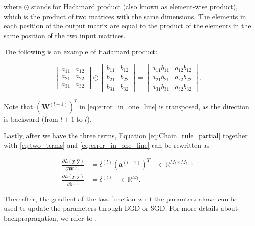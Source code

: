 \documentclass[
	parskip, 			   %
	twoside, 			   %
	DIV=14, 			   %
	BCOR=15.0mm, 		   %
	headsepline, 		   %
	open=right, 		   %
	captions=tableheading, %
	bibliography=totoc,    %
	numbers=noenddot       %
]{scrreprt}
\begin{document}
where $\odot$ stands for Hadamard product (also known as element-wise product), which is the product of two matrices with the same dimensions. The elements in each position of the output matrix are equal to the product of the elements in the same position of the two input matrices. 

The following is an example of Hadamard product:

\begin{equation}
    \label{eq:Hadamard_product}
\left[\begin{array}{ll}
a_{11} & a_{12}  \\
a_{21} & a_{22} \\
a_{31} & a_{32} 
\end{array}\right] \odot \left[\begin{array}{ll}
b_{11} & b_{12}  \\
b_{21} & b_{22}\\
b_{31} & b_{32} 
\end{array}\right]=\left[\begin{array}{ll}
a_{11} b_{11} & a_{12} b_{12} \\
a_{21} b_{21} & a_{22} b_{22}  \\
a_{31} b_{31} & a_{32} b_{32} 
\end{array}\right].
\end{equation}

Note that $(\mathbf{W}^{(l+1)})^T$ in \ref{eq:error_in_one_line} is transposed, as the direction is backward (from $l+1$ to $l$).

Lastly, after we have the three terms, Equation \ref{eq:Chain_rule_partial} together with \ref{eq:two_terms} and \ref{eq:error_in_one_line} can be rewritten as

\begin{equation}
    \label{eq:Chain_rule_partial_deducted}
    \begin{aligned}
        \frac{\partial L\left( \mathbf{y}, \hat{\mathbf{y}} \right)}{\partial \mathbf{W}^{(l)}} &= \delta^{(l)} (\mathbf{a}^{(l-1)})^T \quad \in \mathbb{R}^{M_{l} \times M_{l-1}}
        \\
        \frac{\partial L\left( \mathbf{y}, \hat{\mathbf{y}} \right)}{\partial \mathbf{b}^{(l)}} &= \delta^{(l)} \quad \in \mathbb{R}^{M_{l}}.
    \end{aligned}
\end{equation}

Thereafter, the gradient of the loss function w.r.t the paramters above can be used to update the parameters through BGD or SGD. For more details about backpropragation, we refer to \cite{nielsen2015neural}.
\end{document}
